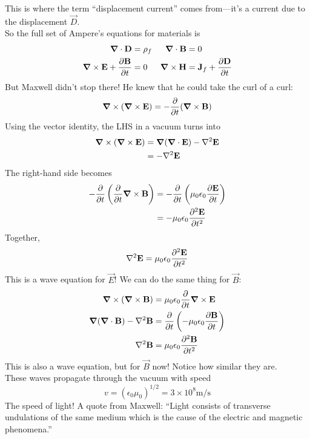 \documentclass[a4paper]{article}
\begin{document}
This is where the term ``displacement current'' comes from---it's a current
due to the displacement $\vec{D}$.\\
So the full set of Ampere's equations for materials is
\begin{align*}
	\boldsymbol{\mathbf{\nabla}} \cdot \boldsymbol{\mathbf{D}} &= \rho_f &
	\boldsymbol{\mathbf{\nabla}} \cdot \boldsymbol{\mathbf{B}} &= 0\\
	\boldsymbol{\mathbf{\nabla}} \times \boldsymbol{\mathbf{E}} + \frac{\partial \boldsymbol{\mathbf{B}}}{\partial t} &= 0 &
	\boldsymbol{\mathbf{\nabla}} \times \boldsymbol{\mathbf{H}} &= \boldsymbol{\mathbf{J}}_f + \frac{\partial \boldsymbol{\mathbf{D}}}{\partial t}
\end{align*}
But Maxwell didn't stop there! He knew that he could take the curl of a curl:
\[ \del\times(\del\times\vec{E}) = -\pd{t}(\del\times\vec{B}) \]
Using the vector identity, the LHS in a vacuum turns into
\begin{align*}
	\boldsymbol{\mathbf{\nabla}}\times(\boldsymbol{\mathbf{\nabla}}\times\boldsymbol{\mathbf{E}})&=\boldsymbol{\mathbf{\nabla}}(\boldsymbol{\mathbf{\nabla}}\cdot\boldsymbol{\mathbf{E}})-\nabla^2\boldsymbol{\mathbf{E}}\\
				     &=-\nabla^2\boldsymbol{\mathbf{E}}
\end{align*}
The right-hand side becomes
\begin{align*}
	-\pd{t}\left(\pd{t}\del\times\vec{B}\right) &=
		-\pd{t}\left(\mu_0\epsilon_0\pder{\vec{E}}{t}\right)\\
		&= -\mu_0\epsilon_0\pder{^2\vec{E}}{t^2}
\end{align*}
Together,
\[ \nabla^2\boldsymbol{\mathbf{E}} = \mu_0\epsilon_0\frac{\partial ^2\boldsymbol{\mathbf{E}}}{\partial t^2} \]
This is a wave equation for $\vec{E}$! We can do the same thing for $\vec{B}$:
\begin{align*}
	\del\times(\del\times\vec{B})&=\mu_0\epsilon_0\pd{t}\del\times\vec{E}\\
	\del(\del\cdot\vec{B})-\nabla^2\vec{B}&=
		\pd{t}\left(-\mu_0\epsilon_0\pder{\vec{B}}{t}\right)\\
	\nabla^2\vec{B}&=
		\mu_0\epsilon_0\pder{^2\vec{B}}{t^2}\\
\end{align*}
This is also a wave equation, but for $\vec{B}$ now! Notice how similar they
are.\\
These waves propagate through the vacuum with speed
\[ v = (\epsilon_0\mu_0)^{1/2} = 3\times10^8 \mathrm{m/s} \]
The speed of light! A quote from Maxwell:
``Light consists of transverse undulations of the same medium which is the
cause of the electric and magnetic phenomena.''
\end{document}
